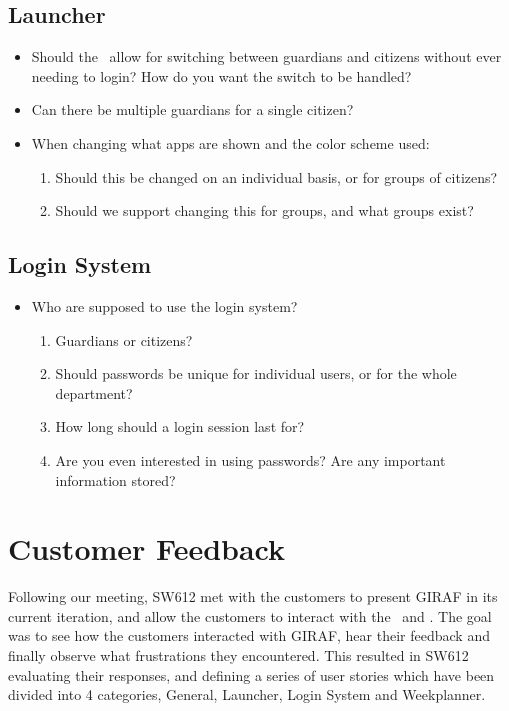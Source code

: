 \subsection{Launcher}
\begin{itemize}
  \item Should the \lapp\ allow for switching between guardians and citizens
  without ever needing to login? How do you want the switch to be handled?
  \item Can there be multiple guardians for a single citizen?
  \item When changing what apps are shown and the color scheme used:
      \begin{enumerate}
      \item Should this be changed on an individual basis, or for groups of
      citizens?
      \item Should we support changing this for groups, and what groups exist?
    \end{enumerate}
\end{itemize}

\subsection{Login System}
\begin{itemize}
  \item Who are supposed to use the login system?
      \begin{enumerate}
      \item Guardians or citizens?
      \item Should passwords be unique for individual users, or for the whole
      department?
      \item How long should a login session last for?
      \item Are you even interested in using passwords? Are any important
      information stored?
    \end{enumerate}
\end{itemize}

\section{Customer Feedback}\label{c2req}
Following our meeting, SW612 met with the customers to present GIRAF in its
current iteration, and allow the customers to interact with the \lapp\ and
\wapp.
The goal was to see how the customers interacted with GIRAF, hear their feedback
and finally observe what frustrations they encountered. This resulted in SW612
evaluating their responses, and defining a series of user stories which have
been divided into 4 categories, General, Launcher, Login System and
Weekplanner.\nl

